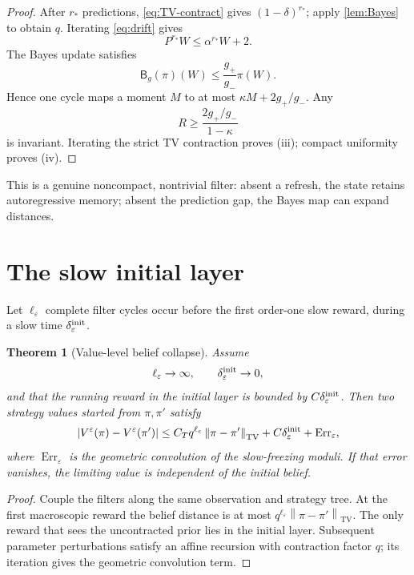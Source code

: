 \documentclass[11pt,reqno]{amsart}
\newtheorem{theorem}{Theorem}[section]
\theoremstyle{definition}
\theoremstyle{remark}
\newcommand{\TV}{\mathrm{TV}}
\newcommand{\norm}[1]{\left\lVert #1\right\rVert}
\newcommand{\abs}[1]{\left\lvert #1\right\rvert}
\begin{document}
\begin{proof}
After $r_*$ predictions, \eqref{eq:TV-contract} gives
$(1-\delta)^{r_*}$; apply \cref{lem:Bayes} to obtain $q$.
Iterating \eqref{eq:drift} gives
\[
 P^{r_*}W\le\alpha^{r_*}W+2.
\]
The Bayes update satisfies
\[
 \mathsf B_g(\pi)(W)
 \le\frac{g_+}{g_-}\pi(W).
\]
Hence one cycle maps a moment $M$ to at most $\kappa M+2g_+/g_-$.  Any
\[
 R\ge\frac{2g_+/g_-}{1-\kappa}
\]
is invariant.  Iterating the strict TV contraction proves (iii); compact
uniformity proves (iv).
\end{proof}

This is a genuine noncompact, nontrivial filter: absent a refresh, the state
retains autoregressive memory; absent the prediction gap, the Bayes map can
expand distances.

\section{The slow initial layer}\label{sec:initial}

Let $\ell_\varepsilon$ complete filter cycles occur before the first order-one
slow reward, during a slow time $\delta_\varepsilon^{\rm init}$.

\begin{theorem}[Value-level belief collapse]\label{thm:value-collapse}
Assume
\[
 \ell_\varepsilon\to\infty,
 \qquad\delta_\varepsilon^{\rm init}\to0,
\]
and that the running reward in the initial layer is bounded by
$C\delta_\varepsilon^{\rm init}$.  Then two strategy values started from
$\pi,\pi'$ satisfy
\begin{equation}\label{eq:value-collapse}
 \abs{V^\varepsilon(\pi)-V^\varepsilon(\pi')}
 \le C_Tq^{\ell_\varepsilon}
 \norm{\pi-\pi'}_{\TV}
 +C\delta_\varepsilon^{\rm init}
 +\operatorname{Err}_\varepsilon,
\end{equation}
where $\operatorname{Err}_\varepsilon$ is the geometric convolution of the
slow-freezing moduli.  If that error vanishes, the limiting value is
independent of the initial belief.
\end{theorem}

\begin{proof}
Couple the filters along the same observation and strategy tree.  At the first
macroscopic reward the belief distance is at most
$q^{\ell_\varepsilon}\norm{\pi-\pi'}_{\TV}$.  The only reward that sees the
uncontracted prior lies in the initial layer.  Subsequent parameter
perturbations satisfy an affine recursion with contraction factor $q$; its
iteration gives the geometric convolution term.
\end{proof}
\end{document}
